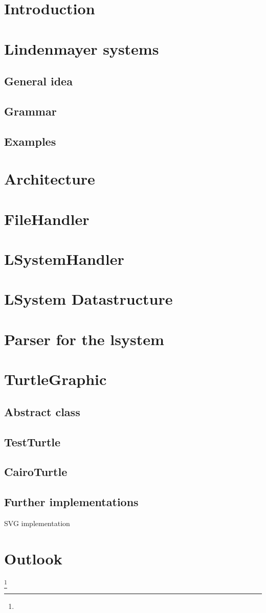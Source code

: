 \documentclass[english]{cpp-hmwk}
\begin{document}
   \section{Introduction}
   
   \pagebreak
   \section{Lindenmayer systems}
   \subsection{General idea}
   \subsection{Grammar}
   \subsection{Examples}
   
   \pagebreak
   \section{Architecture}
   \section{FileHandler}
   \section{LSystemHandler}
   \section{LSystem Datastructure}
   \section{Parser for the lsystem}
   \section{TurtleGraphic}
   \subsection{Abstract class}
   \subsection{TestTurtle}
   \subsection{CairoTurtle}
   \subsection{Further implementations}
   SVG implementation
   
   \pagebreak
   \section{Outlook}
   \footnote{}
\end{document}
